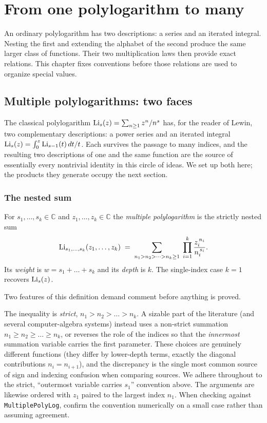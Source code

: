 \chapter{From one polylogarithm to many}
\label{ch:01-foundations}

An ordinary polylogarithm has two descriptions: a series and an iterated
integral. Nesting the first and extending the alphabet of the second produce
the same larger class of functions. Their two multiplication laws then provide
exact relations. This chapter fixes conventions before those relations are
used to organize special values.

\section{Multiple polylogarithms: two faces}

The classical polylogarithm $\operatorname{Li}_s(z)=\sum_{n\ge1}z^n/n^s$ has, for the reader of Lewin, two complementary descriptions: a power series and an iterated integral $\operatorname{Li}_s(z)=\int_0^z\operatorname{Li}_{s-1}(t)\,dt/t$. Each survives the passage to many indices, and the resulting two descriptions of one and the same function are the source of essentially every nontrivial identity in this circle of ideas. We set up both here; the products they generate occupy the next section.

\subsection{The nested sum}

\begin{definition}
For $s_1,\dots,s_k\in\mathbb{C}$ and $z_1,\dots,z_k\in\mathbb{C}$ the \emph{multiple polylogarithm} is the strictly nested sum
\[
  \operatorname{Li}_{s_1,\dots,s_k}(z_1,\dots,z_k)
  \;=\;\sum_{n_1>n_2>\dots>n_k\ge1}\;\prod_{i=1}^{k}\frac{z_i^{\,n_i}}{n_i^{\,s_i}} .
\]
Its \emph{weight} is $w=s_1+\dots+s_k$ and its \emph{depth} is $k$. The single-index case $k=1$ recovers $\operatorname{Li}_s(z)$.
\end{definition}

Two features of this definition demand comment before anything is proved.

\begin{remark}\label{found:rem:conv}
The inequality is \emph{strict}, $n_1>n_2>\dots>n_k$. A sizable part of the literature (and several computer-algebra systems) instead uses a non-strict summation $n_1\ge n_2\ge\dots\ge n_k$, or reverses the role of the indices so that the \emph{innermost} summation variable carries the first parameter. These choices are genuinely different functions (they differ by lower-depth terms, exactly the diagonal contributions $n_i=n_{i+1}$), and the discrepancy is the single most common source of sign and indexing confusion when comparing sources. We adhere throughout to the strict, ``outermost variable carries $s_1$'' convention above. The arguments are likewise ordered with $z_1$ paired to the largest index $n_1$. When checking against \texttt{MultiplePolyLog}, confirm the convention numerically on a small case rather than assuming agreement.
\end{remark}

